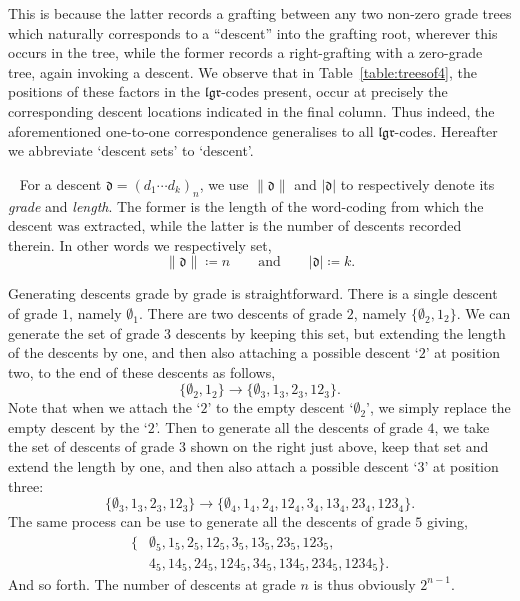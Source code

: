 \documentclass[5p,twocolumn]{elsarticle}
\newcommand*{\el}{\mathfrak l}
\newcommand*{\gl}{\mathfrak g}
\newcommand*{\rl}{\mathfrak r}
\newcommand*{\df}{\mathfrak d}
\begin{document}
This is because the latter records a grafting between any two non-zero grade trees which naturally corresponds to a ``descent'' into the grafting root, wherever this occurs in the tree,
while the former records a right-grafting with a zero-grade tree, again invoking a descent.
We observe that in Table~\ref{table:treesof4}, the positions of these factors in the $\el\gl\rl$-codes present, occur at precisely the corresponding descent locations indicated in the final column. 
Thus indeed, the aforementioned one-to-one correspondence generalises to all $\el\gl\rl$-codes. Hereafter we abbreviate `descent sets' to `descent'.
%
\begin{definition}~\label{def:gradeofdescent}
  For a descent $\df=(d_1\cdots d_k)_n$, we use $\|\df\|$ and $|\df|$ to respectively denote its \emph{grade} and \emph{length}. 
  The former is the length of the word-coding from which the descent was extracted, while the latter is the number of descents recorded therein.
  In other words we respectively set,
  \begin{equation*}
    \|\df\|\coloneqq n\qquad\text{and}\qquad |\df|\coloneqq k.
  \end{equation*}
\end{definition}
%
\begin{remark}\label{rmk:generatingdescents}
Generating descents grade by grade is straightforward. There is a single descent of grade $1$, namely $\emptyset_1$.
There are two descents of grade $2$, namely $\{\emptyset_2,1_2\}$.
We can generate the set of grade $3$ descents by keeping this set, but extending the length of the descents by one,
and then also attaching a possible descent `$2$' at position two, to the end of these descents as follows,
\begin{equation*}
  \{\emptyset_2,1_2\}\to \{\emptyset_3,1_3,2_3,12_3\}.
\end{equation*}
Note that when we attach the `$2$' to the empty descent `$\emptyset_2$', we simply replace the empty descent by the `$2$'.
Then to generate all the descents of grade $4$, we take the set of descents of grade $3$ shown on the right just above,
keep that set and extend the length by one, and then also attach a possible descent `$3$' at position three:
\begin{equation*}
  \{\emptyset_3,1_3,2_3,12_3\}\to\{\emptyset_4,1_4,2_4,12_4,3_4,13_4,23_4,123_4\}.
\end{equation*}
The same process can be use to generate all the descents of grade $5$ giving,
\begin{align*}
  \{&\emptyset_5,1_5,2_5,12_5,3_5,13_5,23_5,123_5,\\
    &4_5,14_5,24_5,124_5,34_5,134_5,234_5,1234_5\}.
\end{align*}
And so forth. The number of descents at grade $n$ is thus obviously $2^{n-1}$. 
\end{remark}
\end{document}
